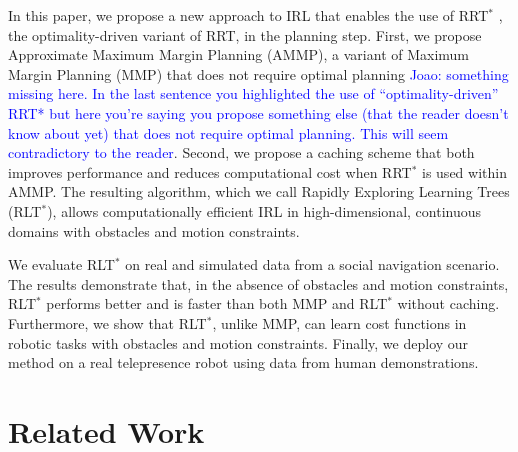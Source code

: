 \documentclass[letterpaper, 10 pt, conference]{ieeeconf}
\newcommand{\jm}[1]{\textcolor{blue}{Joao: #1}}
\begin{document}
In this paper, we propose a new approach to IRL that enables the use of RRT$^*$ \cite{karaman2011sampling}, the optimality-driven variant of RRT, in the planning step.  First, we propose Approximate Maximum Margin Planning (AMMP), a variant of Maximum Margin Planning (MMP) \cite{ratliff2006maximum} that does not require optimal planning \jm{something missing here. In the last sentence you highlighted the use of ``optimality-driven'' RRT* but here you're saying you propose something else (that the reader doesn't know about yet) that does not require optimal planning. This will seem contradictory to the reader}.  Second, we propose a caching scheme that both improves performance and reduces computational cost when RRT$^*$ is used within AMMP. The resulting algorithm, which we call Rapidly Exploring Learning Trees (RLT$^*$),  allows computationally efficient IRL in high-dimensional, continuous domains with obstacles and motion constraints. 

We evaluate RLT$^*$ on real and simulated data from a social navigation scenario. The results demonstrate that, in the absence of obstacles and motion constraints, RLT$^*$ performs better and is faster than both MMP and RLT$^*$ without caching. Furthermore, we show that RLT$^*$, unlike MMP, can learn cost functions in robotic tasks with obstacles and motion constraints. Finally, we deploy our method on a real telepresence robot using data from human demonstrations.




\section{Related Work \label{sec:related_work}}
\end{document}
